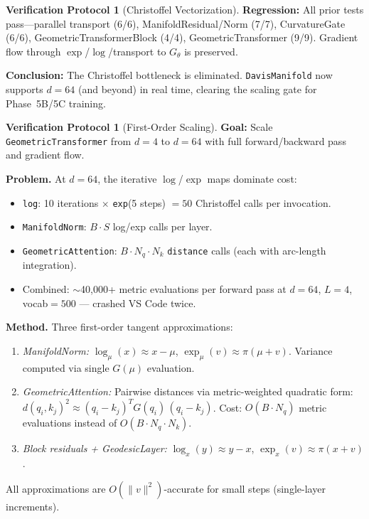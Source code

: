 \documentclass[11pt,a4paper]{article}
\theoremstyle{definition}
\newtheorem{protocol}[theorem]{Verification Protocol}
\theoremstyle{remark}
\begin{document}
\begin{protocol}[Christoffel Vectorization]
\textbf{Regression:} All prior tests pass---parallel transport 
(6/6), ManifoldResidual/Norm (7/7), CurvatureGate (6/6), 
GeometricTransformerBlock (4/4), GeometricTransformer (9/9). 
Gradient flow through $\exp$/$\log$/transport to $G_\theta$ 
is preserved.

\textbf{Conclusion:} The Christoffel bottleneck is eliminated. 
\texttt{DavisManifold} now supports $d = 64$ (and beyond) in 
real time, clearing the scaling gate for Phase~5B/5C training.
\end{protocol}


\begin{protocol}[First-Order Scaling]\label{prot:scaling}
\textbf{Goal:} Scale \texttt{GeometricTransformer} from $d=4$ 
to $d=64$ with full forward/backward pass and gradient flow.

\textbf{Problem.} At $d=64$, the iterative $\log$/$\exp$ maps 
dominate cost:
\begin{itemize}[nosep]
  \item \texttt{log}: 10 iterations $\times$ \texttt{exp}(5 steps) 
  $= 50$ Christoffel calls per invocation.
  \item \texttt{ManifoldNorm}: $B \cdot S$ log/exp calls per layer.
  \item \texttt{GeometricAttention}: $B \cdot N_q \cdot N_k$ 
  \texttt{distance} calls (each with arc-length integration).
  \item Combined: $\sim$40{,}000+ metric evaluations per forward pass 
  at $d=64$, $L=4$, vocab$=500$ --- crashed VS Code twice.
\end{itemize}

\textbf{Method.} Three first-order tangent approximations:
\begin{enumerate}[nosep]
  \item \emph{ManifoldNorm:} $\log_\mu(x) \approx x - \mu$, 
  $\exp_\mu(v) \approx \pi({\mu + v})$. Variance computed via 
  single $G(\mu)$ evaluation.
  \item \emph{GeometricAttention:} Pairwise distances via 
  metric-weighted quadratic form: 
  $d(q_i, k_j)^2 \approx (q_i - k_j)^T G(q_i)\,(q_i - k_j)$. 
  Cost: $O(B \cdot N_q)$ metric evaluations instead of 
  $O(B \cdot N_q \cdot N_k)$.
  \item \emph{Block residuals + GeodesicLayer:} 
  $\log_x(y) \approx y - x$, $\exp_x(v) \approx \pi(x + v)$.
\end{enumerate}
All approximations are $O(\|v\|^2)$-accurate for small steps 
(single-layer increments).


\end{protocol}
\end{document}

